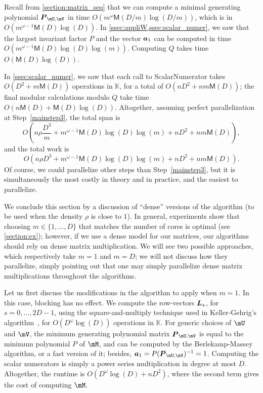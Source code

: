 \documentclass[12pt]{article}
\newcommand{\mat}[1]{\bm{\MakeUppercase{#1}}} %
\newcommand{\row}[1]{\bm{\MakeLowercase{#1}}} %
\newcommand{\minpoly}{P}
\newcommand{\sqfree}{Q}
\newcommand{\density}{\rho}
\def\M {\ensuremath{\mathsf{M}}}
\def\K{\mathbb{K}}
\def\K {\ensuremath{\mathbb{K}}}
\begin{document}
Recall from \cref{section:matrix_seq} that we can compute a minimal
generating polynomial $\mat{P}_{\mU,\mV}$ in time $O(m^{\omega}
\M(D/m) \log(D/m))$, which is in $O(m^{\omega-1} \M(D) \log(D))$.  In
\cref{ssec:appliW,ssec:scalar_numer}, we saw that the
largest invariant factor $P$ and the vector $\row{a}_1$ can be
computed in time $O(m^{\omega-1} \M(D) \log(D) \log(m))$.  Computing $\sqfree$
takes time $O(\M(D) \log(D))$.

In \cref{ssec:scalar_numer}, we saw that each call to {\sf ScalarNumerator}
takes $O(D^2 + m\M(D))$ operations in $\K$, for a total of $O(nD^2 + n
m\M(D))$; the final modular calculations modulo $\sqfree$ take time $O(n\M(D) + \M(D) \log(D))$.
Altogether, assuming perfect parallelization 
at Step~\ref{mainstep3}, the total span is
$$O\left (n\density \frac{D^3}m + m^{\omega-1} \M(D) \log(D) \log(m) + nD^2 + nm\M(D)\right ),$$
and the total work is
$$O\left (n\density D^3 + m^{\omega-1} \M(D) \log(D) \log(m) + nD^2 +
nm\M(D)\right ).$$ Of course, we could parallelize other steps than
Step~\ref{mainstep3}, but it is simultaneously the most costly in
theory and in practice, and the easiest to parallelize. 

\medskip

We conclude this section by a discussion of ``dense'' versions of the
algorithm (to be used when the density $\density$ is close to $1$). In
general, experiments show that choosing $m \in\{1,\dots, D\}$ that
matches the number of cores is optimal (see \cref{section:ex});
however, if we use a dense model for our matrices, our algorithms
should rely on dense matrix multiplication. We will see two possible
approaches, which respectively take $m=1$ and $m=D$; we will not
discuss how they parallelize, simply pointing out that one may simply
parallelize dense matrix multiplications throughout the algorithms.

Let us first discuss the modifications in the algorithm to apply when
$m=1$. In this case, blocking has no effect. We compute the
row-vectors $\mat{L}_s$, for $s=0,\dots,2D-1$, using the
square-and-multiply technique used in Keller-Gehrig's
algorithm~\cite{Keller85}, for $O(D^\omega \log(D))$ operations in
$\K$. For generic choices of $\mU$ and $\mV$, the minimum generating
polynomial matrix $\mat{P}_{\mU,\mV}$ is equal to the minimum
polynomial $\minpoly$ of $\mM$, and can be computed by the
Berlekamp-Massey algorithm, or a fast version of it; besides,
$\row{a}_1 = P (\mat{P}_{\mU,\mV})^{-1} = 1$. Computing the scalar
numerators is simply a power series multiplication in degree at most
$D$. Altogether, the runtime is $O(D^{\omega} \log(D) + nD^2)$, where
the second term gives the cost of computing $\mM$.
\end{document}
